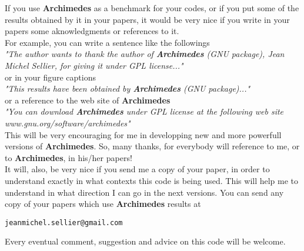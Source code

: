 \documentclass[12pt]{book}
\begin{document}
If you use \textbf{Archimedes} as a benchmark for your codes, or if you put some of the results obtained by it in your papers, it would be very nice if you write in your papers some aknowledgments or references to it.
\\
For example, you can write a sentence like the followings
\\
\textsl{"The author wants to thank the author of \textbf{Archimedes} (GNU package), Jean Michel Sellier, for giving it under GPL license..."}
\\
or in your figure captions
\\
\textsl{"This results have been obtained by \textbf{Archimedes} (GNU package)..."}
\\
or a reference to the web site of \textbf{Archimedes}
\\
\textsl{"You can download \textbf{Archimedes} under GPL license at the following web site www.gnu.org/software/archimedes"}
\\
This will be very encouraging for me in developping new and more powerfull versions of \textbf{Archimedes}. So, many thanks, for everybody will reference to me, or to \textbf{Archimedes}, in his/her papers! \\
It will, also, be very nice if you send me a copy of your paper, in order to understand exactly in what contexts this code is being used. This will help me to understand in what direction I can go in the next versions. You can send any copy of your papers which use \textbf{Archimedes} results at
\begin{verbatim}
jeanmichel.sellier@gmail.com
\end{verbatim}
Every eventual comment, suggestion and advice on this code will be welcome.
\end{document}
